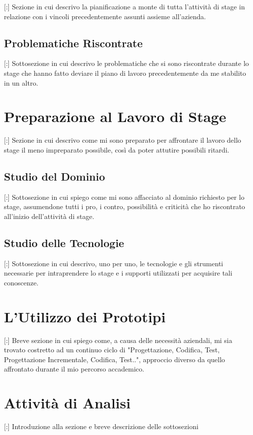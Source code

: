 \documentclass[11pt]{book}              %
\begin{document}
[:] Sezione in cui descrivo la pianificazione a monte di tutta l'attività di stage in relazione con i vincoli precedentemente assunti assieme all'azienda.

\subsection{Problematiche Riscontrate}

[:] Sottosezione in cui descrivo le problematiche che si sono riscontrate durante lo stage che hanno fatto deviare il piano di lavoro precedentemente da me stabilito in un altro.

\section{Preparazione al Lavoro di Stage}

[:] Sezione in cui descrivo come mi sono preparato per affrontare il lavoro dello stage il meno impreparato possibile, così da poter attutire possibili ritardi.

\subsection{Studio del Dominio}

[:] Sottosezione in cui spiego come mi sono affacciato al dominio richiesto per lo stage, assumendone tutti i pro, i contro, possibilità e criticità che ho riscontrato all'inizio dell'attività di stage.

\subsection{Studio delle Tecnologie}

[:] Sottosezione in cui descrivo, uno per uno, le tecnologie e gli strumenti necessarie per intraprendere lo stage e i supporti utilizzati per acquisire tali conoscenze.

\section{L'Utilizzo dei Prototipi}

[:] Breve sezione in cui spiego come, a causa delle necessità aziendali, mi sia trovato costretto ad un continuo ciclo di "Progettazione, Codifica, Test, Progettazione Incrementale, Codifica, Test..", approccio diverso da quello affrontato durante il mio percorso accademico.

\section{Attività di Analisi}
[:] Introduzione alla sezione e breve descrizione delle sottosezioni
\end{document}
